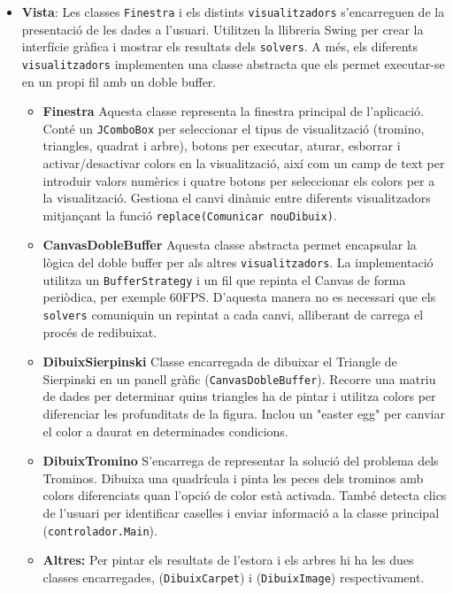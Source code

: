 \documentclass{ieeetj}
\begin{document}
\begin{itemize}
    \item \textbf{Vista}:
    Les classes \texttt{Finestra} i els distints \texttt{visualitzadors} s'encarreguen de la presentació de les dades a l'usuari. Utilitzen la llibreria Swing per crear la interfície gràfica i mostrar els resultats dels \texttt{solvers}.
    A més, els diferents \texttt{visualitzadors} implementen una classe abstracta que els permet executar-se en un propi fil amb un doble buffer.
\begin{itemize}
 \item\textbf{Finestra}
Aquesta classe representa la finestra principal de l'aplicació. Conté un \texttt{JComboBox} per seleccionar el tipus de visualització (tromino, triangles, quadrat i arbre), botons per executar, aturar, esborrar i activar/desactivar colors en la visualització, així com un camp de text per introduir valors numèrics i quatre botons per seleccionar els colors per a la visualització. Gestiona el canvi dinàmic entre diferents visualitzadors mitjançant la funció \texttt{replace(Comunicar nouDibuix)}.

\item \textbf{CanvasDobleBuffer}
Aquesta classe abstracta permet encapsular la lògica del doble buffer per als altres \texttt{visualitzadors}. La implementació utilitza un \texttt{BufferStrategy} i un fil que repinta el Canvas de forma periòdica, per exemple 60FPS. D'aquesta manera no es necessari que els \texttt{solvers} comuniquin un repintat a cada canvi, alliberant de carrega el procés de redibuixat.

\item\textbf{DibuixSierpinski}
Classe encarregada de dibuixar el Triangle de Sierpinski en un panell gràfic (\texttt{CanvasDobleBuffer}). Recorre una matriu de dades per determinar quins triangles ha de pintar i utilitza colors per diferenciar les profunditats de la figura. Inclou un "easter egg" per canviar el color a daurat en determinades condicions. \cite{easter_egg}
\item\textbf{DibuixTromino}
S'encarrega de representar la solució del problema dels Trominos. Dibuixa una quadrícula i pinta les peces dels trominos amb colors diferenciats quan l'opció de color està activada. També detecta clics de l'usuari per identificar caselles i enviar informació a la classe principal (\texttt{controlador.Main}).

\item \textbf{Altres:} Per pintar els resultats de l'estora i els arbres hi ha les dues classes encarregades, (\texttt{DibuixCarpet}) i (\texttt{DibuixImage}) respectivament.
\end{itemize}


\end{itemize}
\end{document}
